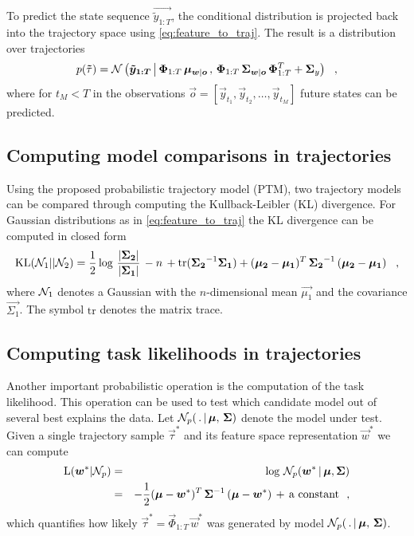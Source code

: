 To predict the state sequence $\vec{\tilde{y}_{1:T}}$, the 
conditional distribution is projected back into the trajectory space using \eqref{eq:feature_to_traj}. 
The result is a distribution over trajectories %
\begin{eqnarray}
  p(\boldsymbol{\tilde}{\tau}) = \mathcal{N}\left(\boldsymbol{\tilde{y}_{1:T}} \, \middle| \, \boldsymbol{\Phi}_{1:T} \, \boldsymbol{\mu}_{\boldsymbol{w}| \boldsymbol{o}} \, , \, \boldsymbol{\Phi}_{1:T} \, 
		  \boldsymbol{\Sigma}_{\boldsymbol{w}|\boldsymbol{o}} \, \boldsymbol{\Phi}_{1:T}^T + \boldsymbol{\Sigma}_y\right) ~~, \label{eq:cond_prob_traj}
\end{eqnarray}
where for $t_M < T$ in the observations $\vec o = [\vec y_{t_1}, \vec y_{t_2}, \dots, \vec y_{t_M}]$ future states can be predicted.

\subsection*{Computing model comparisons in trajectories}

Using the proposed probabilistic trajectory model (PTM), two trajectory models can be compared through computing the Kullback-Leibler (KL) divergence. 
For Gaussian distributions as in \eqref{eq:feature_to_traj} the KL divergence can be computed in closed form 
\begin{eqnarray*}
 \textrm{KL}(\mathcal{N}_1 || \mathcal{N}_2) = \frac{1}{2} \, { \log \, \frac{ |\boldsymbol{\Sigma_2}| }{ |\boldsymbol{\Sigma_1}| } \, - n \, + \textrm{tr}({\boldsymbol{\Sigma_2}}^{-1} \boldsymbol{\Sigma_1}) 
 + (\boldsymbol{\mu_2} - \boldsymbol{\mu_1})^T \, {\boldsymbol{\Sigma_2}}^{-1} \,  (\boldsymbol{\mu_2} - \boldsymbol{\mu_1}) 
 \, } ~~,  
\end{eqnarray*}
where $\mathcal{N}_1$ denotes a Gaussian with the $n$-dimensional mean $\vec{\mu_1}$ and the covariance $\vec{\Sigma_1}$. The symbol $\textrm{tr}$ denotes the matrix trace. 

\subsection*{Computing task likelihoods in trajectories}

Another important probabilistic operation is the computation of the task likelihood. 
This operation can be used to test which candidate model out of several best explains the data. 
Let $\mathcal{N}_p(\, . \, | \, \boldsymbol{\mu}, \, \boldsymbol{\Sigma})$ denote the model under test. 
Given a single trajectory sample $\vec \tau^*$ and its feature space representation $\vec w^*$ we can compute  
\begin{eqnarray*}
 \textrm{L}(\boldsymbol{w}^* | \mathcal{N}_p) &=& \log \, \mathcal{N}_p(\boldsymbol{w}^* \, | \, \boldsymbol{\mu}, \boldsymbol{\Sigma} ) \\ 
 &=& - \frac{1}{2} (\boldsymbol{\mu} - \boldsymbol{w}^*)^T \, {\boldsymbol{\Sigma}}^{-1} \,  (\boldsymbol{\mu} - \boldsymbol{w}^*) \, + \, \textrm{a constant} ~~,  
\end{eqnarray*}
which quantifies how likely $\vec \tau^* = \vec \Phi_{1:T} \, \vec w^*$  was generated by model $\mathcal{N}_p(\, . \, | \, \boldsymbol{\mu}, \, \boldsymbol{\Sigma})$. 


